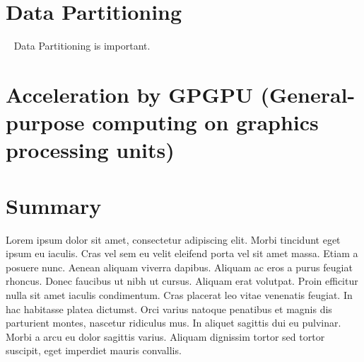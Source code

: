 \section{Data Partitioning}~\cite[p.~357]{Lang17}
Data Partitioning is important.


%
\section[Acceleration by GPGPU]{Acceleration by GPGPU (General-purpose
computing on graphics processing units)}

%
\section{Summary}
Lorem ipsum dolor sit amet, consectetur adipiscing elit. Morbi tincidunt eget
ipsum eu iaculis. Cras vel sem eu velit eleifend porta vel sit amet massa. Etiam
a posuere nunc. Aenean aliquam viverra dapibus. Aliquam ac eros a purus feugiat
rhoncus. Donec faucibus ut nibh ut cursus. Aliquam erat volutpat. Proin efficitur
nulla sit amet iaculis condimentum. Cras placerat leo vitae venenatis feugiat. In
hac habitasse platea dictumst. Orci varius natoque penatibus et magnis dis
parturient montes, nascetur ridiculus mus. In aliquet sagittis dui eu pulvinar.
Morbi a arcu eu dolor sagittis varius. Aliquam dignissim tortor sed tortor
suscipit, eget imperdiet mauris convallis.
